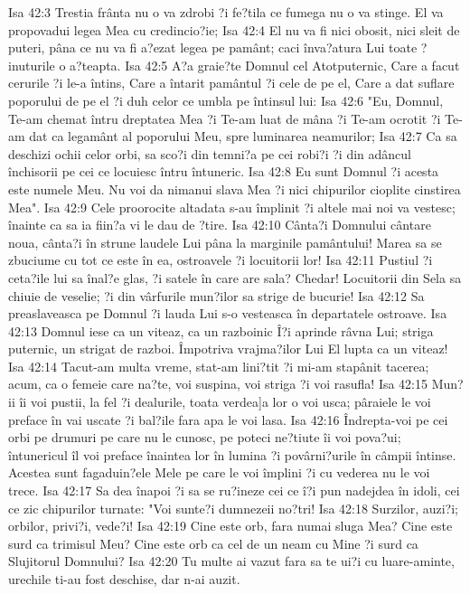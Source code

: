 Isa 42:3  Trestia frânta nu o va zdrobi ?i fe?tila ce fumega nu o va stinge. El va propovadui legea Mea cu credincio?ie;
Isa 42:4  El nu va fi nici obosit, nici sleit de puteri, pâna ce nu va fi a?ezat legea pe pamânt; caci înva?atura Lui toate ?inuturile o a?teapta.
Isa 42:5  A?a graie?te Domnul cel Atotputernic, Care a facut cerurile ?i le-a întins, Care a întarit pamântul ?i cele de pe el, Care a dat suflare poporului de pe el ?i duh celor ce umbla pe întinsul lui:
Isa 42:6  "Eu, Domnul, Te-am chemat întru dreptatea Mea ?i Te-am luat de mâna ?i Te-am ocrotit ?i Te-am dat ca legamânt al poporului Meu, spre luminarea neamurilor;
Isa 42:7  Ca sa deschizi ochii celor orbi, sa sco?i din temni?a pe cei robi?i ?i din adâncul închisorii pe cei ce locuiesc întru întuneric.
Isa 42:8  Eu sunt Domnul ?i acesta este numele Meu. Nu voi da nimanui slava Mea ?i nici chipurilor cioplite cinstirea Mea".
Isa 42:9  Cele proorocite altadata s-au împlinit ?i altele mai noi va vestesc; înainte ca sa ia fiin?a vi le dau de ?tire.
Isa 42:10  Cânta?i Domnului cântare noua, cânta?i în strune laudele Lui pâna la marginile pamântului! Marea sa se zbuciume cu tot ce este în ea, ostroavele ?i locuitorii lor!
Isa 42:11  Pustiul ?i ceta?ile lui sa înal?e glas, ?i satele în care are sala? Chedar! Locuitorii din Sela sa chiuie de veselie; ?i din vârfurile mun?ilor sa strige de bucurie!
Isa 42:12  Sa preaslaveasca pe Domnul ?i lauda Lui s-o vesteasca în departatele ostroave.
Isa 42:13  Domnul iese ca un viteaz, ca un razboinic Î?i aprinde râvna Lui; striga puternic, un strigat de razboi. Împotriva vrajma?ilor Lui El lupta ca un viteaz!
Isa 42:14  Tacut-am multa vreme, stat-am lini?tit ?i mi-am stapânit tacerea; acum, ca o femeie care na?te, voi suspina, voi striga ?i voi rasufla!
Isa 42:15  Mun?ii îi voi pustii, la fel ?i dealurile, toata verdea]a lor o voi usca; pâraiele le voi preface în vai uscate ?i bal?ile fara apa le voi lasa.
Isa 42:16  Îndrepta-voi pe cei orbi pe drumuri pe care nu le cunosc, pe poteci ne?tiute îi voi pova?ui; întunericul îl voi preface înaintea lor în lumina ?i povârni?urile în câmpii întinse. Acestea sunt fagaduin?ele Mele pe care le voi împlini ?i cu vederea nu le voi trece.
Isa 42:17  Sa dea înapoi ?i sa se ru?ineze cei ce î?i pun nadejdea în idoli, cei ce zic chipurilor turnate: "Voi sunte?i dumnezeii no?tri!
Isa 42:18  Surzilor, auzi?i; orbilor, privi?i, vede?i!
Isa 42:19  Cine este orb, fara numai sluga Mea? Cine este surd ca trimisul Meu? Cine este orb ca cel de un neam cu Mine ?i surd ca Slujitorul Domnului?
Isa 42:20  Tu multe ai vazut fara sa te ui?i cu luare-aminte, urechile ti-au fost deschise, dar n-ai auzit.
